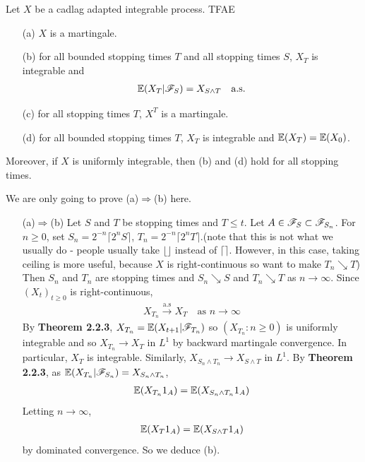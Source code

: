 \documentclass[10pt,a4paper]{report}
\newenvironment{proof}
{\begin{changemargin}{1cm}{0.5cm} 
	}%
	{\end{changemargin}
}
\begin{document}
 Let $X$ be a cadlag adapted integrable process. TFAE
\begin{itemize}
\item[(a)] $X$ is a martingale.
\item[(b)] for all bounded stopping times $T$ and all stopping times $S$, $X_T$ is integrable and
\begin{align*}
\mathbb{E}(X_T |\mathscr{F}_S) = X_{S\wedge T} \quad \text{a.s.} 
\end{align*}
\item[(c)] for all stopping times $T$, $X^T$ is a martingale.
\item[(d)] for all bounded stopping times $T$, $X_T$ is integrable and $\mathbb{E} (X_T) = \mathbb{E}(X_0)$.
\end{itemize}
Moreover, if $X$ is uniformly integrable, then (b) and (d) hold for all stopping times.
\begin{proof}
\pf We are only going to prove (a)$\Rightarrow$(b) here.
\begin{itemize}
\item[(a)$\Rightarrow$(b)] Let $S$ and $T$ be stopping times and $T\leq t$. Let $A\in \mathscr{F}_S \subset \mathscr{F}_{S_n}$. For $n \geq 0$, set $S_n = 2^{-n} \lceil 2^n S \rceil$, $T_n = 2^{-n} \lceil 2^n T \rceil$.(note that this is not what we usually do - people usually take $\lfloor \rfloor$ instead of $\lceil \rceil$. However, in this case, taking ceiling is more useful, because $X$ is right-continuous so want to make $T_n \searrow T$) Then $S_n$ and $T_n$ are stopping times and $S_n \searrow S$ and $T_n \searrow T$ as $n\rightarrow \infty$. Since $(X_t)_{t\geq 0}$ is right-continuous, 
\begin{align*}
X_{T_n} \xrightarrow{\text{a.s}} X_T \quad \text{as } n\rightarrow \infty
\end{align*}
By \textbf{Theorem 2.2.3}, $X_{T_n} = \mathbb{E}(X_{t+1}|\mathscr{F}_{T_n})$ so $(X_{T_n} : n\geq 0)$ is uniformly integrable and so $X_{T_n} \rightarrow X_T$ in $L^1$ by backward martingale convergence. In particular, $X_T$ is integrable. Similarly,  $X_{S_n \wedge T_n} \rightarrow X_{S\wedge T}$ in $L^1$. By \textbf{Theorem 2.2.3}, as $\mathbb{E}(X_{T_n} |\mathscr{F}_{S_n}) = X_{S_n \wedge T_n}$,
\begin{align*}
\mathbb{E}(X_{T_n}1_A) = \mathbb{E}(X_{S_n \wedge T_n} 1_A)
\end{align*} 
Letting $n\rightarrow \infty$,
\begin{align*}
\mathbb{E}(X_T 1_A) = \mathbb{E}(X_{S\wedge T}1_A)
\end{align*}
by dominated convergence. So we deduce (b).
\end{itemize}

\eop
\end{proof}
\end{document}
